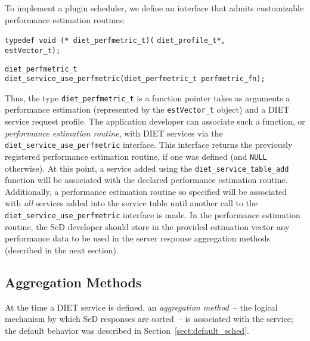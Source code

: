 To implement a plugin scheduler, we define an
interface that admits customizable performance estimation routines:
\begin{tabbing}
  \texttt{typedef void (* diet\_perfmetric\_t)(}
    \=\texttt{diet\_profile\_t*,} \\
    \>\texttt{estVector\_t);} \\
\end{tabbing}
\begin{tabbing}
  \texttt{diet\_perfmetric\_t} \\
  \texttt{diet\_service\_use\_perfmetric(diet\_perfmetric\_t perfmetric\_fn);}\\
\end{tabbing}
Thus, the type \texttt{diet\_perfmetric\_t} is a function pointer
takes as arguments a performance estimation (represented by the
\texttt{estVector\_t} object) and a DIET service request
profile.  The application
developer can associate such a function, or
\emph{performance estimation routine}, with DIET services via the
\texttt{diet\_service\_use\_perfmetric} interface.  This interface
returns the previously registered performance estimation routine, if
one was defined (and
\texttt{NULL} otherwise).  At this point, a service added using the
\texttt{diet\_service\_table\_add} function will be associated with
the declared performance estimation routine.
Additionally, a performance estimation routine so specified will be
associated with \emph{all} services added into the service table until
another call to the
\texttt{diet\_service\_use\_perfmetric} interface is made.
In the performance estimation routine, the SeD developer should store
in the provided estimation vector
any performance data to be used in the server response aggregation
methods (described in the next section).

\subsection{Aggregation Methods}\label{sect:agg_methods}

At the time a DIET service is defined, an \emph{aggregation method}~--
the logical mechanism by which SeD responses are sorted~-- is
associated with the service; the default behavior was described in
Section~\ref{sect:default_sched}.


